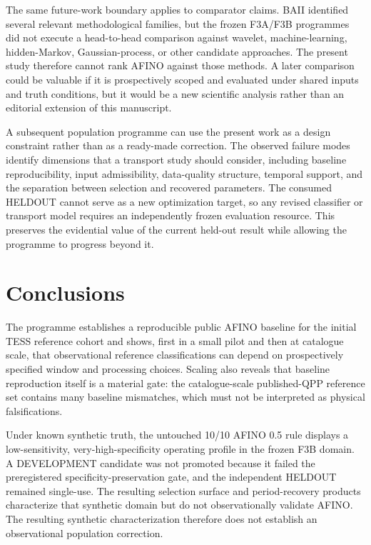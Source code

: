 \documentclass[11pt,a4paper]{article}
\begin{document}
The same future-work boundary applies to comparator claims. BAII identified several relevant methodological families, but the frozen F3A/F3B programmes did not execute a head-to-head comparison against wavelet, machine-learning, hidden-Markov, Gaussian-process, or other candidate approaches. The present study therefore cannot rank AFINO against those methods. A later comparison could be valuable if it is prospectively scoped and evaluated under shared inputs and truth conditions, but it would be a new scientific analysis rather than an editorial extension of this manuscript.

A subsequent population programme can use the present work as a design constraint rather than as a ready-made correction. The observed failure modes identify dimensions that a transport study should consider, including baseline reproducibility, input admissibility, data-quality structure, temporal support, and the separation between selection and recovered parameters. The consumed HELDOUT cannot serve as a new optimization target, so any revised classifier or transport model requires an independently frozen evaluation resource. This preserves the evidential value of the current held-out result while allowing the programme to progress beyond it.

\section{Conclusions}
The programme establishes a reproducible public AFINO baseline for the initial TESS reference cohort and shows, first in a small pilot and then at catalogue scale, that observational reference classifications can depend on prospectively specified window and processing choices. Scaling also reveals that baseline reproduction itself is a material gate: the catalogue-scale published-QPP reference set contains many baseline mismatches, which must not be interpreted as physical falsifications.

Under known synthetic truth, the untouched 10/10 AFINO 0.5 rule displays a low-sensitivity, very-high-specificity operating profile in the frozen F3B domain. A DEVELOPMENT candidate was not promoted because it failed the preregistered specificity-preservation gate, and the independent HELDOUT remained single-use. The resulting selection surface and period-recovery products characterize that synthetic domain but do not observationally validate AFINO. The resulting synthetic characterization therefore does not establish an observational population correction.
\end{document}
